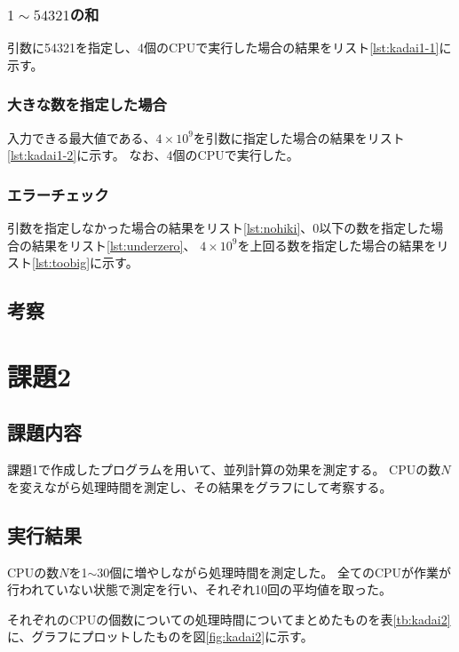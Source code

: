 \documentclass[a4j,titlepage]{jsarticle}
\begin{document}
\subsubsection{$1 \sim 54321$の和}
引数に54321を指定し、4個のCPUで実行した場合の結果をリスト\ref{lst:kadai1-1}に示す。

\subsubsection{大きな数を指定した場合}
入力できる最大値である、$4 \times 10^9$を引数に指定した場合の結果をリスト\ref{lst:kadai1-2}に示す。
なお、4個のCPUで実行した。

\subsubsection{エラーチェック}
引数を指定しなかった場合の結果をリスト\ref{lst:nohiki}、0以下の数を指定した場合の結果をリスト\ref{lst:underzero}、
$4 \times 10^9$を上回る数を指定した場合の結果をリスト\ref{lst:toobig}に示す。

\subsection{考察}


\section{課題2}
\subsection{課題内容}
課題1で作成したプログラムを用いて、並列計算の効果を測定する。
CPUの数$N$を変えながら処理時間を測定し、その結果をグラフにして考察する。

\subsection{実行結果}
CPUの数$N$を1$\sim$30個に増やしながら処理時間を測定した。
全てのCPUが作業が行われていない状態で測定を行い、それぞれ10回の平均値を取った。

それぞれのCPUの個数についての処理時間についてまとめたものを表\ref{tb:kadai2}に、グラフにプロットしたものを図\ref{fig:kadai2}に示す。
\end{document}
